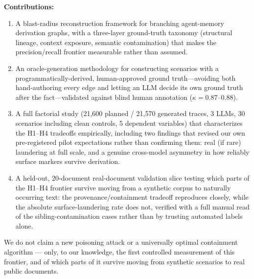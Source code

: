 \textbf{Contributions:}
\begin{enumerate}
\item A blast-radius reconstruction framework for branching agent-memory
  derivation graphs, with a three-layer ground-truth taxonomy
  (structural lineage, context exposure, semantic contamination) that
  makes the precision/recall frontier measurable rather than assumed.
\item An oracle-generation methodology for constructing scenarios with a
  programmatically-derived, human-approved ground truth---avoiding
  both hand-authoring every edge and letting an LLM decide its own
  ground truth after the fact---validated against blind human
  annotation ($\kappa = 0.87$--$0.88$).
\item A full factorial study (21,600 planned / 21,570 generated traces, 3 LLMs, 30
  scenarios including clean controls, 5 dependent variables) that
  characterizes the H1--H4 tradeoffs empirically, including two
  findings that revised our own pre-registered pilot expectations
  rather than confirming them: real (if rare) laundering at full
  scale, and a genuine cross-model asymmetry in how reliably surface
  markers survive derivation.
\item A held-out, 20-document real-document validation slice testing
  which parts of the H1--H4 frontier survive moving from a synthetic
  corpus to naturally occurring text: the provenance/containment
  tradeoff reproduces closely, while the absolute surface-laundering
  rate does not, verified with a full manual read of the
  sibling-contamination cases rather than by trusting automated labels
  alone.
\end{enumerate}

We do not claim a new poisoning attack or a universally optimal
containment algorithm --- only, to our knowledge, the first controlled
measurement of this frontier, and of which parts of it survive moving
from synthetic scenarios to real public documents.
